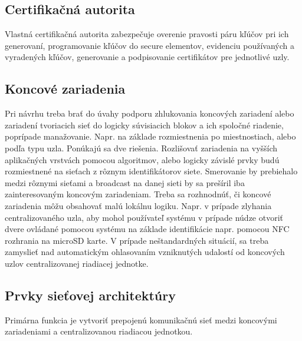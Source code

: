 \documentclass[12pt,a4paper,oneside,openright]{report}
\begin{document}
\subsection{Certifikačná autorita}
Vlastná certifikačná autorita zabezpečuje overenie pravosti páru kľúčov pri ich generovaní, programovanie kľúčov do secure elementov, evidenciu používaných a vyradených kľúčov, generovanie a podpisovanie certifikátov pre jednotlivé uzly.

\subsection{Koncové zariadenia} 
Pri návrhu treba brať do úvahy podporu zhlukovania koncových zariadení alebo zariadení tvoriacich sieť do logicky súvisiacich blokov a ich spoločné riadenie, poprípade manažovanie. Napr. na základe rozmiestnenia po miestnostiach, alebo podľa typu uzla. Ponúkajú sa dve riešenia. Rozlišovať zariadenia na vyšších aplikačných vrstvách pomocou algoritmov, alebo logicky závislé prvky budú rozmiestnené na sieťach z rôznym identifikátorov siete. Smerovanie by prebiehalo medzi rôznymi sieťami a broadcast na danej sieti by sa prešíril iba zainteresovaným koncovým zariadeniam.
Treba sa rozhnodnúť, či koncové zariadenia môžu obsahovať malú lokálnu logiku. Napr. v prípade zlyhania centralizovaného uzla, aby mohol používateľ systému v prípade núdze otvoriť dvere ovládané pomocou systému na základe identifikácie napr. pomocou NFC rozhrania na microSD karte.
V prípade neštandardných situácií, sa treba zamyslieť nad automatickým ohlasovaním vzniknutých udalostí od koncových uzlov centralizovanej riadiacej jednotke.

\subsection{Prvky sieťovej architektúry}
Primárna funkcia je vytvoriť prepojenú komunikačnú sieť medzi koncovými zariadeniami a centralizovanou riadiacou jednotkou.
\end{document}
